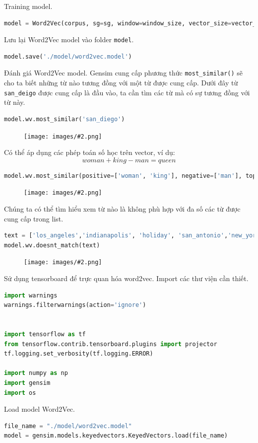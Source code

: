 \documentclass[12pt]{article}
\newcommand{\includeImage}[3]{
\begin{figure}[H]
  \centering
  \texttt{[image: images/\#2.png]}
  \def\temp{#3}\ifx\temp\empty\else\caption{#3}\fi
\end{figure}}
\begin{document}
\vskip 0.5cm
\indent Training model.
\begin{lstlisting}[language=python]
  model = Word2Vec(corpus, sg=sg, window=window_size, vector_size=vector_size, min_count=min_count, workers=workers, epochs=epochs)
\end{lstlisting}

\vskip 0.5cm
\indent Lưu lại Word2Vec model vào folder \texttt{model}.
\begin{lstlisting}[language=python]
model.save('./model/word2vec.model')
\end{lstlisting}

\vskip 0.5cm
\indent Đánh giá Word2Vec model. Gensim cung cấp phương thức \texttt{most\_similar()} sẽ cho ta biết những từ nào tương đồng với một từ được cung cấp. Dưới đây từ \texttt{san\_deigo} được cung cấp là đầu vào, ta cần tìm các từ mà có sự tương đồng với từ này.
\begin{lstlisting}[language=python]
model.wv.most_similar('san_diego')
\end{lstlisting}
\includeImage{1}{21}{}

\vskip 0.5cm
\indent Có thể áp dụng các phép toán số học trên vector, ví dụ:
$$woman + king - man = queen$$
\begin{lstlisting}[language=python]
model.wv.most_similar(positive=['woman', 'king'], negative=['man'], topn=1)
\end{lstlisting}
\includeImage{1}{22}{}

\vskip 0.5cm
\indent Chúng ta có thể tìm hiểu xem từ nào là không phù hợp với đa số các từ được cung cấp trong list.
\begin{lstlisting}[language=python]
text = ['los_angeles','indianapolis', 'holiday', 'san_antonio','new_york']
model.wv.doesnt_match(text)
\end{lstlisting}
\includeImage{1}{23}{}

\vskip 0.5cm
\indent Sử dụng tensorboard để trực quan hóa word2vec. Import các thư viện cần thiết. 
\begin{lstlisting}[language=python]
import warnings
warnings.filterwarnings(action='ignore')


import tensorflow as tf
from tensorflow.contrib.tensorboard.plugins import projector
tf.logging.set_verbosity(tf.logging.ERROR)

import numpy as np
import gensim
import os
\end{lstlisting}

\vskip 0.5cm
\indent Load model Word2Vec.
\begin{lstlisting}[language=python]
file_name = "./model/word2vec.model"
model = gensim.models.keyedvectors.KeyedVectors.load(file_name)
\end{lstlisting}
\end{document}
